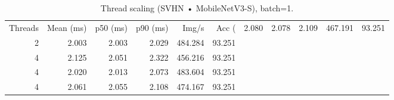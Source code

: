 \begin{table}
\caption{Thread scaling (SVHN • MobileNetV3-S), batch=1.}
\label{tab:threads_svhn_mobilenet_v3_small}
\begin{tabular}{rrrrrr}
\toprule
Threads & Mean (ms) & p50 (ms) & p90 (ms) & Img/s & Acc (%
 & 2.080 & 2.078 & 2.109 & 467.191 & 93.251 \\
2 & 2.003 & 2.003 & 2.029 & 484.284 & 93.251 \\
4 & 2.125 & 2.051 & 2.322 & 456.216 & 93.251 \\
4 & 2.020 & 2.013 & 2.073 & 483.604 & 93.251 \\
4 & 2.061 & 2.055 & 2.108 & 474.167 & 93.251 \\
\bottomrule
\end{tabular}
\end{table}
